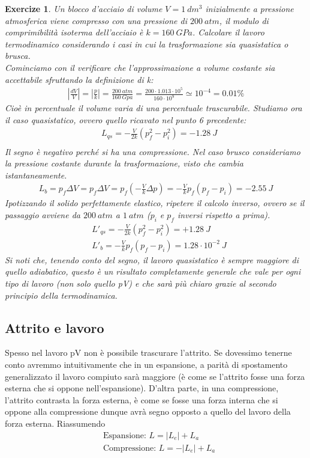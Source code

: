 \documentclass[10pt,a4paper]{article}
\newtheorem{exercize}{Exercize}
\begin{document}
\begin{exercize}
	Un blocco d'acciaio di volume $V = 1\ dm^3$ inizialmente a pressione atmosferica viene compresso con una pressione di $200\ atm$, il modulo di comprimibilità isoterma dell'acciaio è $k = 160\ GPa$. Calcolare il lavoro termodinamico considerando i casi in cui la trasformazione sia quasistatica o brusca.\\
	Cominciamo con il verificare che l'approssimazione a volume costante sia accettabile sfruttando la definizione di k:
	\begin{align*}
		|\frac{dV}{V}|=|\frac{p}{k}|=\frac{200\ atm}{160\ Gpa}=\frac{200\cdot 1.013\cdot 10^5}{160\cdot 10^9} \simeq 10^{-4} = 0.01 \%
	\end{align*}
	Cioè in percentuale il volume varia di una percentuale trascurabile. Studiamo ora il caso quasistatico, ovvero quello ricavato nel punto 6 precedente:
	\begin{align*}
		&L_{qs} = -\frac{V}{2k}\left(p_f^2-p_i^2\right) = -1.28\ J\\	
	\end{align*}
	Il segno è negativo perché si ha una compressione. Nel caso brusco consideriamo la pressione costante durante la trasformazione, visto che cambia istantaneamente.
	\begin{align*}
	L_b = p_f\Delta V = p_f\Delta V = p_f\left(-\frac{V}{k}\Delta p \right)=-\frac{V}{k} p_f(p_f - p_i) = -2.55\ J
	\end{align*}
	Ipotizzando il solido perfettamente elastico, ripetere il calcolo inverso, ovvero se il passaggio avviene da $200\ atm$ a $1\ atm$ ($p_i$ e $p_f$ inversi rispetto a prima).
	\begin{align*}
		&L'_{qs} = -\frac{V}{2k}\left(p_f^2-p_i^2\right) = +1.28\ J\\
		&L'_b = -\frac{V}{k} p_f(p_f - p_i) = 1.28 \cdot 10^{-2}\ J
	\end{align*}
	Si noti che, tenendo conto del segno, il lavoro quasistatico è sempre maggiore di quello adiabatico, questo è un risultato completamente generale che vale per ogni tipo di lavoro (non solo quello pV) e che sarà più chiaro grazie al secondo principio della termodinamica.
\end{exercize}
\subsection{Attrito e lavoro}
Spesso nel lavoro pV non è possibile trascurare l'attrito. Se dovessimo tenerne conto avremmo intuitivamente che in un espansione, a parità di spostamento generalizzato il lavoro compiuto sarà maggiore (è come se l'attrito fosse una forza esterna che si oppone nell'espansione). D'altra parte, in una compressione, l'attrito contrasta la forza esterna, è come se fosse una forza interna che si oppone alla compressione dunque avrà segno opposto a quello del lavoro della forza esterna. Riassumendo
\begin{align*}
	&\text{Espansione: } L = |L_e| + L_a\\
	&\text{Compressione: } L = -|L_e| +L_a
\end{align*}
\end{document}
